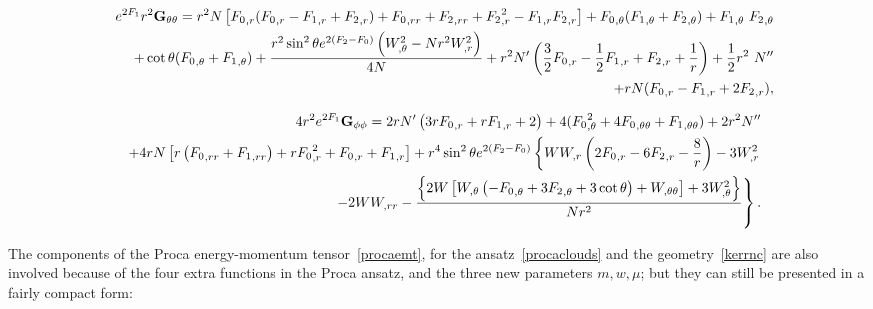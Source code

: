 \documentclass{article}
\numberwithin{equation}{section}
\begin{document}
\begin{eqnarray}
&&  e^{2F_1}r^2{\bf G_{\theta\theta}}=r^2 N\left[ {F_0}_{,r}({F_0}_{,r}- 
{F_1}_{,r}+{F_2}_{,r}) + {F_0}_{,rr}+
{F_2}_{,rr}+ {F_2}_{,r}^2-{F_1}_{,r} {F_2}_{,r} \right]
%
+{F_0}_{,\theta}( {F_1}_{,\theta}+ 
{F_2}_{,\theta})+{F_1}_{,\theta} \
{F_2}_{,\theta}
%
 \nonumber \\
&& +\cot \theta( {F_0}_{,\theta}+ {F_1}_{,\theta})+\frac{r^2 \sin ^2\theta 
 e^{2( {F_2}- {F_0})}\left(W_{,\theta}^2-Nr^2  W_{,r}^2\right)}{4 N}+r^2 N' \left(\frac{3}{2} {F_0}_{,r}-\frac{1}{2}  {F_1}_{,r}+
{F_2}_{,r}+\frac{1}{r}\right)+\frac{1}{2} r^2 \
N''
 \nonumber \\
&&
+r N(
{F_0}_{,r}-
{F_1}_{,r}+2 {F_2}_{,r}),
\end{eqnarray}



\begin{eqnarray}
&& 4r^2e^{2F_1}{\bf G_{\phi\phi}}= 2 r N'  \left(3 r {F_0}_{,r}+r 
{F_1}_{,r}+2\right)+4 (
{F_0}_{,\theta}^2  +4{F_0}_{,\theta\theta}+ {F_1}_{,\theta\theta}) +2 r^2 N''  \nonumber \\
%
&& 
%
+4 r N  \left[r \left({F_0}_{,rr}+{F_1}_{,rr}\right)+r 
{F_0}_{,r}^2+{F_0}_{,r}+{F_1}_{,r}\right] +r^4 \sin ^2\theta e^{2 ({F_2}-F_0)}\left\{ W W_{,r}\left(2  {F_0}_{,r}-6 {F_2}_{,r}-\frac{8}{r}\right)-3  W_{,r}^2\right. \nonumber \\
%
&&
\left.-2 WW_{,rr}- \frac{\left\{2 W \left[W_{,\theta} \left(- {F_0}_{,\theta}
+3 {F_2}_{,\theta}+3 \cot \theta\right)+ W_{,\theta\theta}\right]+3 W_{,\theta}^2\right\}}{Nr^2}\right\} .
\end{eqnarray}






The components of the Proca energy-momentum tensor~\eqref{procaemt}, for the ansatz~\eqref{procaclouds} and the geometry~\eqref{kerrnc} are also involved because of the four extra functions in the Proca ansatz, and the three new parameters $m,w,\mu$; but they can still be presented in a fairly compact form:
\end{document}
